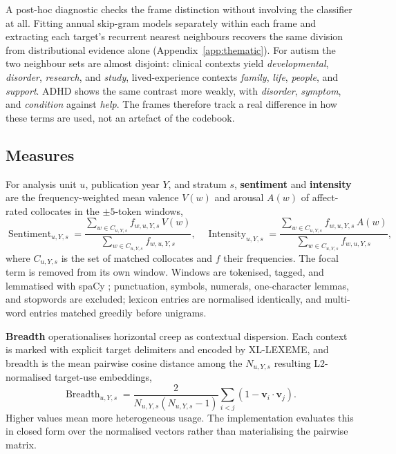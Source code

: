 \documentclass[final]{clv2025}
\begin{document}
A post-hoc diagnostic checks the frame distinction without involving the classifier at all.
Fitting annual skip-gram models separately within each frame and extracting each target's
recurrent nearest neighbours \citep{mikolovDistributed2013,vylomovaSemanticChangesHarmrelated2021}
recovers the same division from distributional evidence alone (Appendix~\ref{app:thematic}).
For autism the two neighbour sets are almost disjoint: clinical contexts yield
\emph{developmental}, \emph{disorder}, \emph{research}, and \emph{study}, lived-experience
contexts \emph{family}, \emph{life}, \emph{people}, and \emph{support}. ADHD shows the same
contrast more weakly, with \emph{disorder}, \emph{symptom}, and \emph{condition} against
\emph{help}. The frames therefore track a real difference in how these terms are used, not
an artefact of the codebook.

\subsection{Measures}

For analysis unit $u$, publication year $Y$, and stratum $s$, \textbf{sentiment} and
\textbf{intensity} are the frequency-weighted mean valence $V(w)$ and arousal $A(w)$ of
affect-rated collocates in the $\pm5$-token windows,
\begin{equation}
\operatorname{Sentiment}_{u,Y,s} =
\frac{\sum_{w \in C_{u,Y,s}} f_{w,u,Y,s}\,V(w)}{\sum_{w \in C_{u,Y,s}} f_{w,u,Y,s}},
\quad
\operatorname{Intensity}_{u,Y,s} =
\frac{\sum_{w \in C_{u,Y,s}} f_{w,u,Y,s}\,A(w)}{\sum_{w \in C_{u,Y,s}} f_{w,u,Y,s}},
\end{equation}
where $C_{u,Y,s}$ is the set of matched collocates and $f$ their frequencies. The focal
term is removed from its own window. Windows are tokenised, tagged, and lemmatised with
spaCy \citep{honnibalSpacy2020}; punctuation, symbols, numerals, one-character lemmas, and
stopwords are excluded; lexicon entries are normalised identically, and multi-word entries
matched greedily before unigrams.

\textbf{Breadth} operationalises horizontal creep as contextual dispersion. Each context is
marked with explicit target delimiters and encoded by XL-LEXEME, and breadth is the mean
pairwise cosine distance among the $N_{u,Y,s}$ resulting L2-normalised target-use
embeddings,
\begin{equation}
\operatorname{Breadth}_{u,Y,s} =
\frac{2}{N_{u,Y,s}(N_{u,Y,s}-1)}
\sum_{i<j}\left(1 - \mathbf{v}_i \cdot \mathbf{v}_j\right).
\end{equation}
Higher values mean more heterogeneous usage. The implementation evaluates this in closed
form over the normalised vectors rather than materialising the pairwise matrix.
\end{document}
